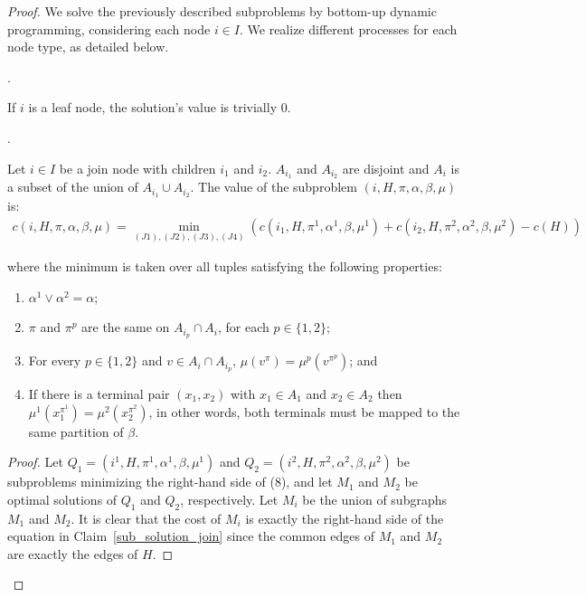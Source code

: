\begin{proof}


We solve the previously described subproblems by bottom-up dynamic programming, considering each node $i \in I$. We realize different processes for each node type, as detailed below.


.

If \(i\) is a leaf node, the solution's value is trivially 0.

.

\begin{claim} \label{sub_solution_join}
    Let $i \in I$ be a join node with children $i_1$ and $i_2$.
    \(A_{i_1}\) and \(A_{i_2}\) are disjoint and \(A_i\) is a subset of the union of \(A_{i_1} \cup A_{i_2}\).
    The value of the subproblem $(i, H, \pi, \alpha, \beta, \mu)$ is:
\begin{align*}
  c(i, H, \pi, \alpha, \beta, \mu) = \min_{(J1), (J2), (J3), (J4)} \left(c(i_1, H, \pi^1, \alpha^1, \beta, \mu^1) + c(i_2, H, \pi^2, \alpha^2, \beta, \mu^2) - c(H)\right)
\end{align*}

where the minimum is taken over all tuples satisfying the following properties:

\begin{enumerate}[(J1)]
    \item \(\alpha^1 \vee \alpha^2 = \alpha\);
    \item \(\pi\) and \(\pi^p\) are the same on \(A_{i_p} \cap A_i\), for each \(p  \in \{1, 2\}\);
    \item For every \(p  \in \{1, 2\}\) and \(v \in A_i \cap A_{i_p}\), \(\mu(v^\pi) = \mu^p(v^{\pi^p})\); and
    \item If there is a terminal pair \((x_1, x_2)\) with \(x_1 \in A_1\) and \(x_2 \in A_2\) then \(\mu^1(x_1^{\pi^1}) = \mu^2(x_2^{\pi^2})\), in other words, both terminals must be mapped to the same partition of \(\beta\).
\end{enumerate}

\end{claim}

\begin{proof}
Let \(Q_1 = (i^1, H, \pi^1, \alpha^1, \beta, \mu^1)\) and \(Q_2 = (i^2, H, \pi^2, \alpha^2, \beta, \mu^2)\) be subproblems minimizing the right-hand side of (8), and let \(M_1\) and \(M_2\) be optimal solutions of \(Q_1\) and \(Q_2\), respectively. Let \(M_i\) be the union of subgraphs \(M_1\) and \(M_2\). It is clear that the cost of \(M_i\) is exactly the right-hand side of the equation in Claim~\ref{sub_solution_join} since the common edges of \(M_1\) and \(M_2\) are exactly the edges of \(H\).


\end{proof}
\end{proof}
